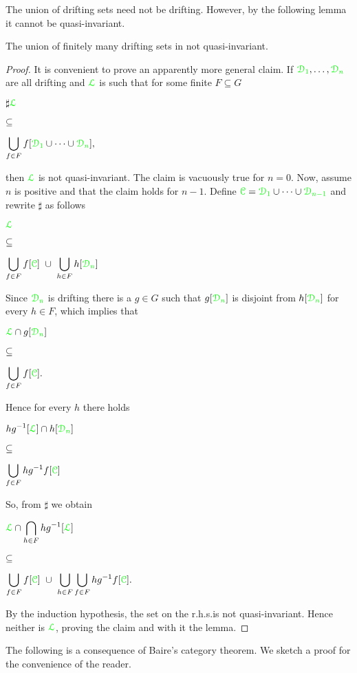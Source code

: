 \documentclass[creche.tex]{subfiles}
\begin{document}
The union of drifting sets need not be drifting. However, by the following lemma it cannot be quasi-invariant.

\begin{lemma}\label{lem_newelski}
The union of finitely many drifting sets in not quasi-invariant.
\end{lemma}


\begin{proof}
\def\medrel#1{\parbox[t]{6ex}{$\displaystyle\hfil #1$}}
\def\ceq#1#2#3{\noindent\parbox[t]{30ex}{$\displaystyle #1$}\medrel{#2}{$\displaystyle #3$}}

It is convenient to prove an apparently more general claim. If ${\color{green}\EuScript D_1},\dots,{\color{green}\EuScript D_n}$ are all drifting and ${\color{green}\EuScript L}$ is such that for some finite $F\subseteq G$\medskip 

\ceq{\sharp\hfill{\gr\Ll}}{\subseteq}{\bigcup_{f\in F}f[{\gr\D_1}\cup\dots\cup{\gr\D_n}],} 

then ${\color{green}\EuScript L}$ is not quasi-invariant. The claim is vacuously true for $n=0$. Now, assume $n$ is positive and that the claim holds for $n-1$. Define ${\color{green}\EuScript C}={\color{green}\EuScript D_1}\cup\dots\cup{\color{green}\EuScript D_{n-1}}$ and rewrite $\sharp$ as follows

\ceq{\hfill{\gr\Ll}}{\subseteq}{\bigcup_{f\in F}f[\grC]\ \cup\ \bigcup_{h\in F}h[{\gr\D_n}]}

Since ${\color{green}\EuScript D_n}$ is drifting there is a $g\in G$ such that $g[{\color{green}\EuScript D_n}]$ is disjoint from $h[{\color{green}\EuScript D_n}]$ for every $h\in F$, which implies that\medskip 

\ceq{\hfill{\gr\Ll}\cap g[{\gr\D_n}]}{\subseteq}{\bigcup_{f\in F}f[\grC].} 

Hence for every $h$ there holds\medskip 

\ceq{\hfill h g^{-1}[{\gr\Ll}]\cap h[{\gr\D_n}]}{\subseteq}{\bigcup_{f\in F}hg^{-1}f[\grC]} 

So, from $\sharp$ we obtain\medskip 

\ceq{\hfill{\gr\Ll}\cap\bigcap_{h\in F}h g^{-1}[{\gr\Ll}]}{\subseteq}{\bigcup_{f\in F}f[\grC]\ \cup\ \bigcup_{h\in F}\bigcup_{f\in F}hg^{-1}f[\grC].}\smallskip


\noindent By the induction hypothesis, the set on the r.h.s.\@ is not quasi-invariant. Hence neither is ${\color{green}\EuScript L}$, proving the claim and with it the lemma.
\end{proof}

The following is a consequence of Baire's category theorem. We sketch a proof for the convenience of the reader.
\end{document}
